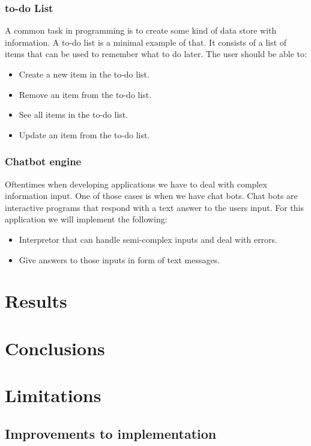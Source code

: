 \documentclass[12pt]{article}
\theoremstyle{definition}
\theoremstyle{theorem}
\begin{document}
\subsubsection{to-do List}

A common task in programming is to create some kind of data store with
information. A to-do list is a minimal example of that. It consists of a list of
items that can be used to remember what to do later. The user should be able to:

\begin{itemize}
    \item Create a new item in the to-do list.
    \item Remove an item from the to-do list.
    \item See all items in the to-do list.
    \item Update an item from the to-do list.
\end{itemize}

\subsubsection{Chatbot engine}

Oftentimes when developing applications we have to deal with complex information
input. One of those cases is when we have chat bots. Chat bots are interactive
programs that respond with a text answer to the users input. For this
application we will implement the following:

\begin{itemize}
    \item Interpretor that can handle semi-complex inputs and deal with errors.
    \item Give answers to those inputs in form of text messages.
\end{itemize}    

\section{Results}\label{results}

\section{Conclusions}\label{conclusions}

\section{Limitations}\label{limitations}

\subsection{Improvements to implementation}



\end{document}
